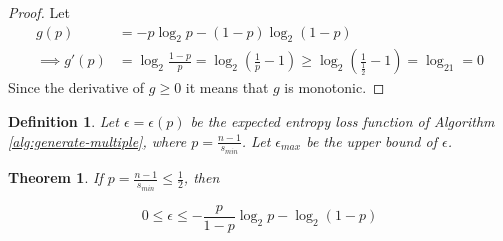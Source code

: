 \documentclass[12pt]{article}
\newtheorem{definition}{Definition}
\newtheorem{theorem}{Theorem}
\begin{document}
\begin{proof}
    Let
    \begin{align}
        g(p) & = -p\log_2 p - (1-p)\log_2(1-p) \\
        \implies g'(p) & = \log_2\frac{1-p}{p} = \log_2(\frac{1}{p}-1) \ge \log_2(\frac{1}{\frac{1}{2}}-1) = \log_21 = 0 
    \end{align}
Since the derivative of $g\ge 0$ it means that $g$ is monotonic.
\end{proof}

\begin{definition}
    Let $\epsilon = \epsilon(p)$ be the expected entropy loss function of Algorithm \ref{alg:generate-multiple}, where $p=\frac{n-1}{s_{min}}$. Let $\epsilon_{max}$ be the upper bound of $\epsilon$.
\end{definition}

\begin{theorem}
    \label{thm:loss}
If $p = \frac{n-1}{s_{min}} \le \frac{1}{2}$, then

\begin{equation}
0 \le \epsilon \le -\frac{p}{1-p}\log_2p - \log_2(1-p)
\end{equation}

\end{theorem}
\end{document}
